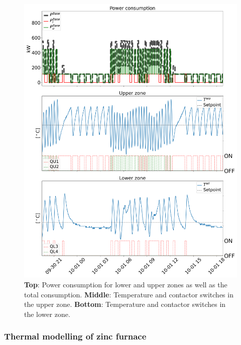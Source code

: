 \documentclass[conference]{IEEEtran}
\begin{document}
\begin{figure}[t]
    \centering
    \includegraphics[width=\columnwidth]{../figures/data_visualization.png}
    \caption{\textbf{Top}: Power consumption for lower and upper zones as well as the total consumption. \textbf{Middle}: Temperature and contactor switches in the upper zone. \textbf{Bottom}: Temperature and contactor switches in the lower zone.}
    \label{fig:data_visualization}
\end{figure}

\subsubsection{Thermal modelling of zinc furnace}
\end{document}
